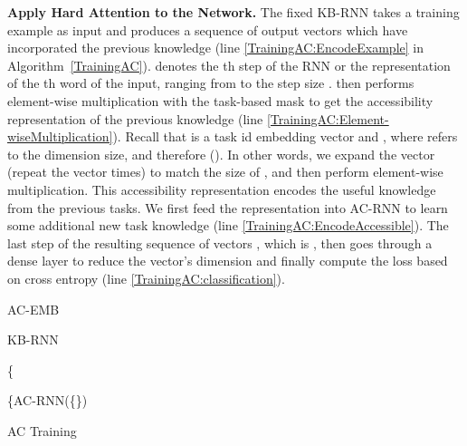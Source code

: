 \documentclass[runningheads]{llncs}
\begin{document}
\vspace{+4mm}
\noindent 
\textbf{Apply Hard Attention to the Network.} The fixed KB-RNN takes a training example  as input and produces a sequence of output vectors  which have incorporated the previous knowledge (line \ref{TrainingAC:EncodeExample} in Algorithm~\ref{TrainingAC}).  denotes the th step of the RNN or the representation of the th word of the input, {\color{black}ranging from  to the step size }.  then performs element-wise multiplication with the task-based mask  to get the accessibility representation of the previous knowledge  (line \ref{TrainingAC:Element-wiseMultiplication}). Recall that  is a task id embedding vector and , where  refers to the dimension size, {\color{black}and therefore  ()}. In other words, we expand the vector  (repeat the vector  times) to match the {\color{black}size} of , and then perform element-wise multiplication. This accessibility representation encodes the useful knowledge from the previous tasks. We first feed the representation into AC-RNN to learn some additional new task knowledge (line \ref{TrainingAC:EncodeAccessible}). The last step of the resulting sequence of vectors , which is {\color{black},} then goes through a dense layer to reduce the vector's dimension and finally compute the loss based on cross entropy (line \ref{TrainingAC:classification}). 


\begin{algorithm}[H]
\DontPrintSemicolon

  \setcounter{AlgoLine}{0}

  AC-EMB  \label{TrainingAC:start:a_t}   
 

    \label{TrainingAC:end:a_t}   

  KB-RNN  \label{TrainingAC:EncodeExample}   
  
  \{  \label{TrainingAC:Element-wiseMultiplication} 

  \{AC-RNN(\{\}) \label{TrainingAC:EncodeAccessible} 
 
   \label{TrainingAC:classification} 

\caption{AC Training}
\label{TrainingAC}
\end{algorithm}
\end{document}
